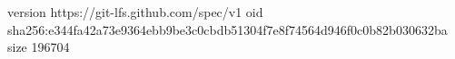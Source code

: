 version https://git-lfs.github.com/spec/v1
oid sha256:e344fa42a73e9364ebb9be3c0cbdb51304f7e8f74564d946f0c0b82b030632ba
size 196704

